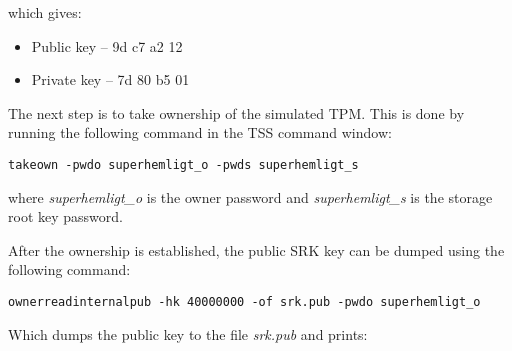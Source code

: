 \documentclass[10pt]{article}
\newcommand{\command}[1]{\texttt{#1}}
\begin{document}
      which gives:

      \begin{itemize}
        \item{Public key -- 9d c7 a2 12}
        \item{Private key -- 7d 80 b5 01}
      \end{itemize}

      The next step is to take ownership of the simulated TPM. This is done by
      running the following command in the TSS command window:

      \command{takeown -pwdo superhemligt\_o -pwds superhemligt\_s}

      where \textit{superhemligt\_o} is the owner password and
      \textit{superhemligt\_s} is the storage root key password.

      After the ownership is established, the public SRK key can be dumped using
      the following command:

      \command{ownerreadinternalpub -hk 40000000 -of srk.pub -pwdo
      superhemligt\_o}

      Which dumps the public key to the file \textit{srk.pub} and prints:
\end{document}
